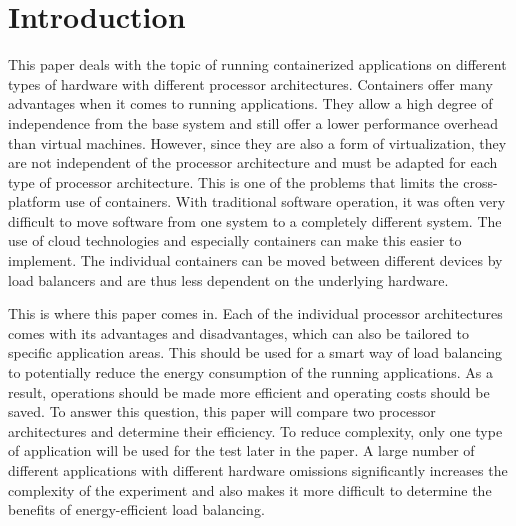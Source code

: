 \section{Introduction}
This paper deals with the topic of running containerized applications on different types of hardware with different processor architectures.
Containers offer many advantages when it comes to running applications. They allow a high degree of independence from the base system and still offer a lower performance overhead than virtual machines. However, since they are also a form of virtualization, they are not independent of the processor architecture and must be adapted for each type of processor architecture. This is one of the problems that limits the cross-platform use of containers.
With traditional software operation, it was often very difficult to move software from one system to a completely different system. The use of cloud technologies and especially containers can make this easier to implement. The individual containers can be moved between different devices by load balancers and are thus less dependent on the underlying hardware.

This is where this paper comes in. Each of the individual processor architectures comes with its advantages and disadvantages, which can also be tailored to specific application areas. This should be used for a smart way of load balancing to potentially reduce the energy consumption of the running applications. As a result, operations should be made more efficient and operating costs should be saved.
To answer this question, this paper will compare two processor architectures and determine their efficiency. To reduce complexity, only one type of application will be used for the test later in the paper. A large number of different applications with different hardware omissions significantly increases the complexity of the experiment and also makes it more difficult to determine the benefits of energy-efficient load balancing.
\\

